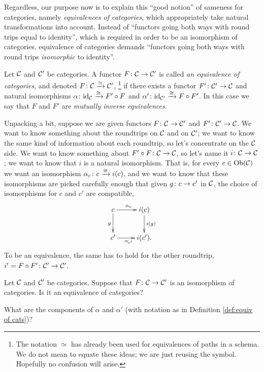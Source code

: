 Regardless, our purpose now is to explain this “good notion” of sameness for categories, namely {\em equivalences of categories}, which appropriately take natural transformations into account. Instead of “functors going both ways with round trips equal to identity”, which is required in order to be an isomorphism of categories, equivalence of categories demands “functors going both ways with round trips {\em isomorphic} to identity”.

\begin{definition}\label{def:equiv of cats}

Let $\mathcal{C}$ and $\mathcal{C}'$ be categories. A functor $F\colon\mathcal{C}\rightarrow\mathcal{C}'$ is called {\em an equivalence of categories}, and denoted $F\colon\mathcal{C}\xrightarrow{\simeq}\mathcal{C}'$,
\footnote{The notation $\simeq$ has already been used for equivalences of paths in a schema. We do not mean to equate these ideas; we are just reusing the symbol. Hopefully no confusion will arise.}
 if there exists a functor $F'\colon\mathcal{C}'\rightarrow\mathcal{C}$ and natural isomorphisms $\alpha\colon \textnormal{id}_\mathcal{C}\xrightarrow{\cong}F'\circ F$ and $\alpha'\colon\textnormal{id}_{\mathcal{C}'}\xrightarrow{\cong}F\circ F'$. In this case we say that $F$ and $F'$ are {\em mutually inverse equivalences}.

\end{definition}

Unpacking a bit, suppose we are given functors $F\colon\mathcal{C}\rightarrow\mathcal{C}'$ and $F'\colon\mathcal{C}'\rightarrow\mathcal{C}$. We want to know something about the roundtrips on $\mathcal{C}$ and on $\mathcal{C}'$; we want to know the same kind of information about each roundtrip, so let's concentrate on the $\mathcal{C}$ side. We want to know something about $F'\circ F\colon\mathcal{C}\rightarrow\mathcal{C}$, so let's name it $i\colon\mathcal{C}\rightarrow\mathcal{C}$; we want to know that $i$ is a natural isomorphism. That is, for every $c\in\textnormal{Ob}(\mathcal{C})$ we want an isomorphism $\alpha_c\colon c\xrightarrow{\cong} i(c)$, and we want to know that these isomorphisms are picked carefully enough that given $g\colon c\rightarrow c'$ in $\mathcal{C}$, the choice of isomorphisms for $c$ and $c'$ are compatible,
$$\xymatrix{c\ar[r]^{\alpha_c}\ar[d]_g&i(c)\ar[d]^{i(g)}\\c'\ar[r]_{\alpha_{c'}}&i(c').}$$
To be an equivalence, the same has to hold for the other roundtrip, $i'=F\circ F'\colon\mathcal{C}'\rightarrow\mathcal{C}'.$

\begin{exercise}
Let $\mathcal{C}$ and $\mathcal{C}'$ be categories. Suppose that $F\colon\mathcal{C}\rightarrow\mathcal{C}'$ is an isomorphism of categories.
\sexc Is it an equivalence of categories?
\item What are the components of $\alpha$ and $\alpha'$ (with notation as in Definition \ref{def:equiv of cats})?
\endsexc
\end{exercise}

